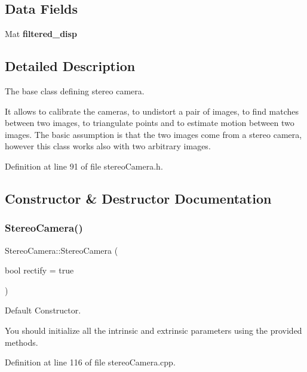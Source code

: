 \subsection*{Data Fields}
\begin{DoxyCompactItemize}
\item 
\mbox{\label{classStereoCamera_ab7a8b46716078f726d757c96e1f34cc6}} 
Mat {\bfseries filtered\+\_\+disp}
\end{DoxyCompactItemize}


\subsection{Detailed Description}
The base class defining stereo camera. 

It allows to calibrate the cameras, to undistort a pair of images, to find matches between two images, to triangulate points and to estimate motion between two images. The basic assumption is that the two images come from a stereo camera, however this class works also with two arbitrary images. 

Definition at line 91 of file stereo\+Camera.\+h.



\subsection{Constructor \& Destructor Documentation}
\mbox{\label{classStereoCamera_a11256fe5a509436abc714a594b6cc801}} 
\subsubsection{\texorpdfstring{Stereo\+Camera()}{StereoCamera()}\hspace{0.1cm}{\footnotesize\ttfamily [1/3]}}
{\footnotesize\ttfamily Stereo\+Camera\+::\+Stereo\+Camera (\begin{DoxyParamCaption}\item[{bool}]{rectify = {\ttfamily true} }\end{DoxyParamCaption})}



Default Constructor. 

You should initialize all the intrinsic and extrinsic parameters using the provided methods. 

Definition at line 116 of file stereo\+Camera.\+cpp.


